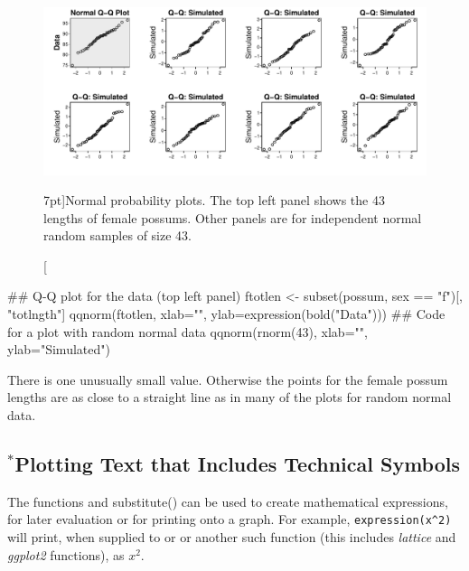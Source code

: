 \begin{figure}
\begin{Schunk}


\centerline{\includegraphics[width=\textwidth]{figs/09-possum-qqn-1} }

\end{Schunk}
 \caption[][7pt]{Normal probability plots. The top left panel
   shows the 43 lengths
of female possums. Other panels are for independent normal
random samples of size 43.\label{fig:np-plots}}
\vspace*{-24pt}

\end{figure}

\begin{Schunk}
\begin{Sinput}
## Q-Q plot for the data (top left panel)
ftotlen <- subset(possum, sex == "f")[, "totlngth"]
qqnorm(ftotlen, xlab="",
       ylab=expression(bold("Data")))
## Code for a plot with random normal data
qqnorm(rnorm(43), xlab="", ylab="Simulated")
\end{Sinput}
\end{Schunk}

\noindent There is one unusually small value.  Otherwise the points
for the female possum lengths are as close to a straight line as in
many of the plots for random normal data.

\subsection{$^*$Plotting Text that Includes Technical  Symbols}\label{sec:mathvec}

The functions  and {substitute()} can be used
to create mathematical expressions, for later evaluation or for
printing onto a graph.  For example, \verb+expression(x^2)+ will
print, when supplied to  or  or another
such function (this includes {\em lattice} and {\em ggplot2} functions),
as $x^2$.

